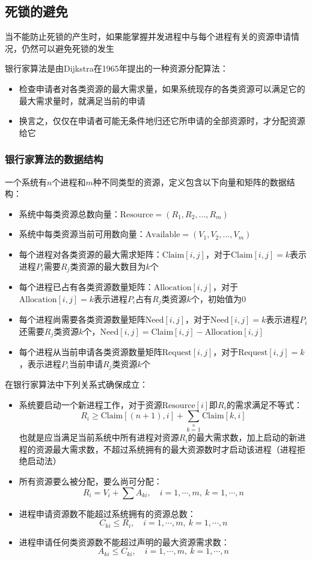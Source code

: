 \documentclass[cs4size,a4paper,10pt]{ctexart}
\begin{document}
	\subsection{死锁的避免}
	当不能防止死锁的产生时，如果能掌握并发进程中与每个进程有关的资源申请情况，仍然可以避免死锁的发生

	银行家算法是由Dijkstra在1965年提出的一种资源分配算法：
	\begin{itemize}
		\item 检查申请者对各类资源的最大需求量，如果系统现存的各类资源可以满足它的最大需求量时，就满足当前的申请
		\item 换言之，仅仅在申请者可能无条件地归还它所申请的全部资源时，才分配资源给它
	\end{itemize}

	\subsubsection{银行家算法的数据结构}
	一个系统有$n$个进程和$m$种不同类型的资源，定义包含以下向量和矩阵的数据结构：
	\begin{itemize}
		\item 系统中每类资源总数向量：$\mathrm{Resource}=(R_1,R_2,...,R_m)$
		\item 系统中每类资源当前可用数向量：$\mathrm{Available}=(V_1,V_2,...,V_m)$
		\item 每个进程对各类资源的最大需求矩阵：$\mathrm{Claim}[i,j]$，对于$\mathrm{Claim}[i,j]=k$表示进程$P_i$需要$R_j$类资源的最大数目为$k$个
		\item 每个进程已占有各类资源数量矩阵：$\mathrm{Allocation}[i,j]$，对于$\mathrm{Allocation}[i,j] = k$表示进程$P_i$占有$R_j$类资源$k$个，初始值为0
		\item 每个进程尚需要各类资源数量矩阵$\mathrm{Need}[i,j]$，对于$\mathrm{Need}[i,j] = k$表示进程$P_i$还需要$R_j$类资源$k$个，$\mathrm{Need}[i,j] =\mathrm{Claim}[i,j] - \mathrm{Allocation}[i,j]$
		\item 每个进程从当前申请各类资源数量矩阵$\mathrm{Request}[i,j]$，对于$\mathrm{Request}[i,j] = k$，表示进程$P_i$当前申请$R_j$类资源$k$个
	\end{itemize}

	在银行家算法中下列关系式确保成立：
	\begin{itemize}
		\item 系统要启动一个新进程工作，对于资源$\mathrm{Resource}[i]$即$R_i$的需求满足不等式：
		$$R_i \geq \mathrm{Claim}[(n+1), i] + \sum\limits_{k=1}\limits^n \mathrm{Claim}[k, i]$$
		也就是应当满足当前系统中所有进程对资源$R_i$的最大需求数，加上启动的新进程的资源最大需求数，不超过系统拥有的最大资源数时才启动该进程（进程拒绝启动法）
		\item 所有资源要么被分配，要么尚可分配：
		$$R_i=V_i+\sum A_{ki},\quad  i=1,\cdots,m,\ k=1,\cdots,n$$
		\item 进程申请资源数不能超过系统拥有的资源总数：
		$$C_{ki} \leq R_i,\quad i=1,\cdots,m,\ k=1,\cdots,n$$
		\item 进程申请任何类资源数不能超过声明的最大资源需求数：
		$$A_{ki} \leq C_{ki},\quad i=1,\cdots,m,\ k=1,\cdots,n$$
	\end{itemize}
	
\end{document}
